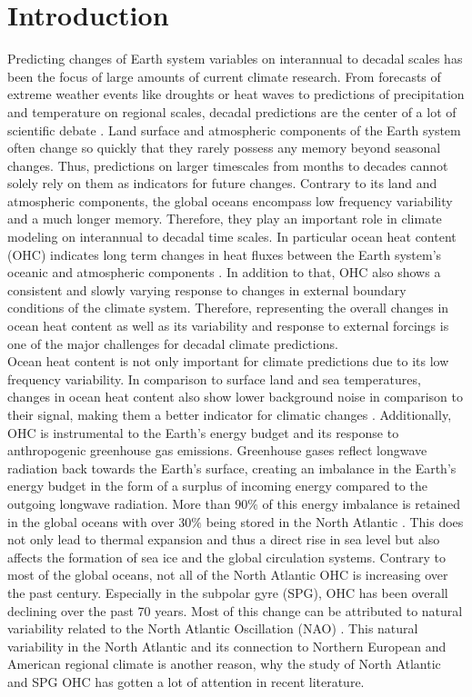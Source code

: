 \documentclass[Masterarbeit.tex]{subfile}
\begin{document}
	
	\chapter{Introduction}
	
	Predicting changes of Earth system variables on interannual to decadal scales has been the focus of large amounts of current climate research. From forecasts of extreme weather events like droughts or heat waves to predictions of precipitation and temperature on regional scales, decadal predictions are the center of a lot of scientific debate \citep{marotzke_miklip_2016, keenlyside_prospects_2010}. Land surface and atmospheric components of the Earth system often change so quickly that they rarely possess any memory beyond seasonal changes. Thus, predictions on larger timescales from months to decades cannot solely rely on them as indicators for future changes. Contrary to its land and atmospheric components, the global oceans encompass low frequency variability and  a much longer memory. Therefore, they play an important role in climate modeling on interannual to decadal time scales. In particular ocean heat content (OHC) indicates long term changes in heat fluxes between the Earth system's oceanic and atmospheric components \citep{cheng_improved_2017}. In addition to that, OHC also shows a consistent and slowly varying response to changes in external boundary conditions of the climate system. Therefore, representing the overall changes in ocean heat content as well as its variability and response to external forcings is one of the major challenges for decadal climate predictions.\\
	Ocean heat content is not only important for climate predictions due to its low frequency variability. In comparison to surface land and sea temperatures, changes in ocean heat content also show lower background noise in comparison to their signal, making them a better indicator for climatic changes \citep{cheng_decadal_2018}. Additionally, OHC is instrumental to the Earth's energy budget and its response to anthropogenic greenhouse gas emissions. Greenhouse gases reflect longwave radiation back towards the Earth's surface, creating an imbalance in the Earth's energy budget in the form of a surplus of incoming energy compared to the outgoing longwave radiation. More than $90 \%$ of this energy imbalance is retained in the global oceans with over $30 \%$ being stored in the North Atlantic \citep{hakkinen_heat_2015}. This does not only lead to thermal expansion and thus a direct rise in sea level but also affects the formation of sea ice and the global circulation systems. Contrary to most of the global oceans, not all of the North Atlantic OHC is increasing over the past century. Especially in the subpolar gyre (SPG), OHC has been overall declining over the past 70 years. Most of this change can be attributed to natural variability related to the North Atlantic Oscillation (NAO) \citep{lozier_spatial_2008}. This natural variability in the North Atlantic and its connection to Northern European and American regional climate is another reason, why the study of North Atlantic and SPG OHC has gotten a lot of attention in recent literature.\\
\end{document}
